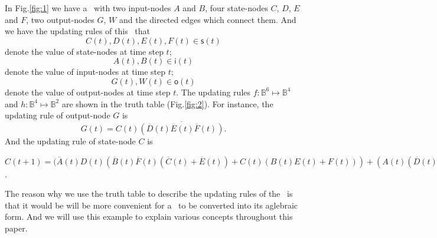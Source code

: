 
\begin{example}
In Fig.\ref{fig:1} we have a \BCN\ with two input-nodes $A$ and $B$, four state-nodes $C$, $D$, $E$ and $F$, two output-nodes $G$, $W$ and the directed edges which connect them. And we have the updating rules of this \BCN\ that 
\[C(t), D(t), E(t), F(t)\in \mathsf{s}(t)\] 
denote the value of state-nodes at time step $t$;
\[A(t), B(t)\in \mathsf{i}(t)\]
 denote the value of input-nodes at time step $t$;
\[G(t), W(t)\in \mathsf{o}(t)\] 
denote the value of output-nodes at time step $t$.
The updating rules $f:\mathbb{B}^{6}\mapsto \mathbb{B}^4$ and $h:\mathbb{B}^4\mapsto \mathbb{B}^2$ are shown in the truth table (Fig.\ref{fig:2}).  For instance, the updating rule of output-node $G$ is 
\[G(t)=C(t)\overline{(\overline{D}(t)\overline{ E}(t)\overline{F}(t))}.\]
And the updating rule of state-node $C$ is 

$C(t+1)=
(\overline{A}(t)D(t) (\overline{B}(t) \overline{F}(t) (\overline{C}(t) + \overline{E}(t)) + C(t)(B(t)E(t)+F(t)))
+(A(t)(\overline{D}(t)(\overline{B}(t)\overline{C}(t)+\overline{E}(t)F(t)+\overline{C}(t)F(t))+B(t)E(t)\overline{F}(t)))
+(\overline{B}(t)E(t)(C(t)\overline{D}(t)\overline{F}(t)+D(t)F(t)))
(B(t)\overline{E}(t)(\overline{C}(t)F(t)+C(t)\overline{D}(t)))$.

The reason why we use the truth table to describe the updating rules of the \BCN\ is that it would be will be more convenient for a \BCN\ to be converted into its aglebraic form. And we will use this example to explain various concepts throughout this paper.
  \begin{figure}[thpb]
      \centering
      

\end{figure}
\end{example}
